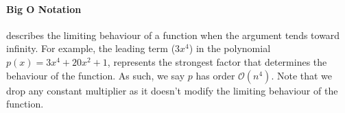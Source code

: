 \paragraph{Big O Notation} describes the limiting behaviour of a function when the argument tends toward infinity.
\label{supp::big_o}
For example, the leading term ($3 x^4$) in the polynomial $p(x) = 3 x^4 + 20 x^2 + 1$, represents the strongest factor that determines the behaviour of the function. As such, we say $p$ has order $\mathcal{O}(n^4)$. Note that we drop any constant multiplier as it doesn't modify the limiting behaviour of the function.